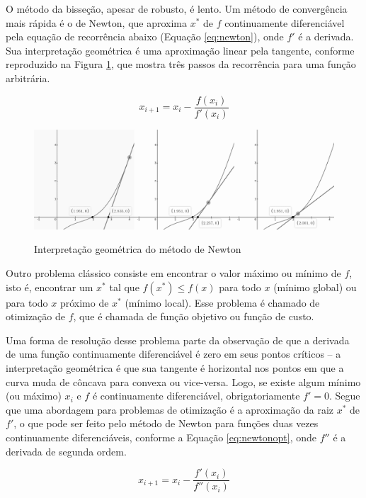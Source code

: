 \documentclass[cic,tc]{iiufrgs}
\begin{document}
O método da bisseção, apesar de robusto, é lento. Um método de convergência
mais rápida é o de Newton, que aproxima $x^*$ de $f$ continuamente diferenciável
pela equação de recorrência abaixo (Equação \ref{eq:newton}), onde $f'$ é a
derivada. Sua interpretação geométrica é uma aproximação linear pela tangente,
conforme reproduzido na Figura \ref{fig:tan}, que mostra três passos da
recorrência para uma função arbitrária.

\begin{equation}
\label{eq:newton}
x_{i + 1} = x_i - \frac{f(x_i)}{f'(x_i)}
\end{equation}

\begin{figure} \caption{Interpretação geométrica do método de Newton} \begin{center}
\includegraphics[width=0.8\linewidth]{img/tan.png} \end{center}
 \label{fig:tan} \end{figure}

Outro problema clássico consiste em encontrar o valor máximo ou mínimo de $f$,
isto é, encontrar um $x^*$ tal que $f(x^*) \le f(x)$ para todo $x$ (mínimo
global) ou para todo $x$ próximo de $x^*$ (mínimo local). Esse problema é
chamado de otimização de $f$, que é chamada de função objetivo ou função de
custo.

Uma forma de resolução desse problema parte da observação de que a derivada de
uma função continuamente diferenciável é zero em seus pontos críticos -- a
interpretação geométrica é que sua tangente é horizontal nos pontos em que a
curva muda de côncava para convexa ou vice-versa. Logo, se existe algum mínimo
(ou máximo) $x_i$ e $f$ é continuamente diferenciável, obrigatoriamente $f' =
0$. Segue que uma abordagem para problemas de otimização é a aproximação da
raiz $x^*$ de $f'$, o que pode ser feito pelo método de Newton para funções
duas vezes continuamente diferenciáveis, conforme a Equação \ref{eq:newtonopt},
onde $f''$ é a derivada de segunda ordem.

\begin{equation}
\label{eq:newtonopt}
x_{i + 1} = x_i - \frac{f'(x_i)}{f''(x_i)}
\end{equation}
\end{document}
